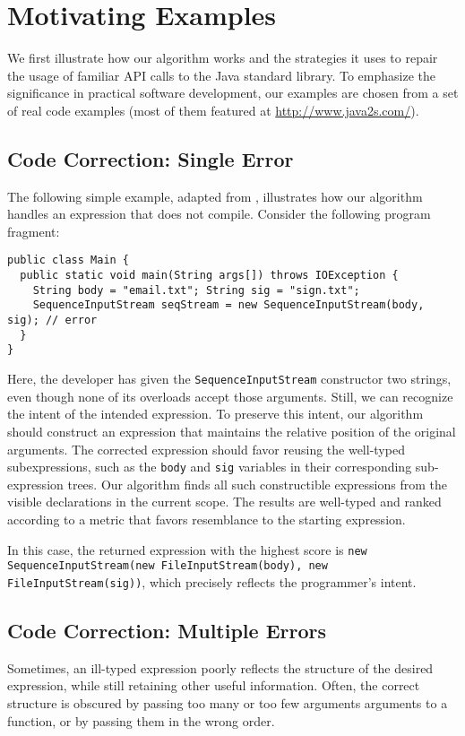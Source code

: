 \section{Motivating Examples}
\label{sec:examples}
We first illustrate how our algorithm works and the strategies it uses to repair the usage of familiar API calls to  the Java standard library. To emphasize the significance in practical software development, our examples are chosen from a set of real code examples (most of them featured at \url{http://www.java2s.com/}{}).

\subsection{Code Correction: Single Error}
\label{sec:examples:single}
The following simple example, adapted from \cite{GveroETAL13CompleteCompletionTypesWeights}, illustrates how our algorithm handles an expression that does not compile. Consider the following program fragment:
\begin{lstlisting}
public class Main {
  public static void main(String args[]) throws IOException {
    String body = "email.txt"; String sig = "sign.txt";
    SequenceInputStream seqStream = new SequenceInputStream(body, sig); // error
  }
} 
\end{lstlisting}
Here, the developer has given the \lstinline{SequenceInputStream} constructor two strings, even though none of its overloads accept those arguments. Still, we can recognize the intent of the intended expression. To preserve this intent, our algorithm should construct an expression that maintains the relative position of the original arguments. The corrected expression should favor reusing the well-typed subexpressions, such as the \lstinline{body} and \lstinline{sig} variables in their corresponding sub-expression trees. Our algorithm finds all such constructible expressions from the visible declarations in the current scope. The results are well-typed and ranked according to a metric that favors resemblance to the starting expression.

In this case, the returned expression with the highest score is \lstinline{new SequenceInputStream(new FileInputStream(body), new FileInputStream(sig))}, which precisely reflects the programmer's intent.

\subsection{Code Correction: Multiple Errors}
\label{sec:examples:multiple}
Sometimes, an ill-typed expression poorly reflects the structure of the desired expression, while still retaining other useful information. Often, the correct structure is obscured by passing too many or too few arguments arguments to a function, or by passing them in the wrong order.

